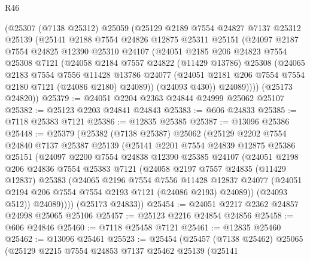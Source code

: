 \begin{lexlean}{R46}
\begin{coremodule}
    (@25307
      (@7138 @25312)
      @25059
      (@25129
        @2189
        @7554
        @24827
        @7137
        @25312
        @25139
        (@25141
          @2188
          @7554
          @24826
          @12875
          @25311
          @25151
          (@24097
            @2187
            @7554
            @24825
            @12390
            @25310
            @24107
            (@24051
              @2185
              @206
              @24823
              @7554
              @25308
              @7121
              (@24058
                @2184
                @7557
                @24822
                (@11429 @13786)
                @25308
                (@24065
                  @2183
                  @7554
                  @7556
                  @11428
                  @13786
                  @24077
                  (@24051 @2181 @206 @7554 @7554 @2180 @7121 (@24086 @2180) @24089))
                (@24093 @430))
              @24089))))
      (@25173 @24820))
@25379 := @24051 @2204 @2363 @24844 @24999 @25062 @25107
@25382 := @25123 @2203 @24841 @24843
@25383 := @606 @24833
@25385 := @7118 @25383 @7121
@25386 := @12835 @25385
@25387 := @13096 @25386
@25448 := @25379
    (@25382
      (@7138 @25387)
      @25062
      (@25129
        @2202
        @7554
        @24840
        @7137
        @25387
        @25139
        (@25141
          @2201
          @7554
          @24839
          @12875
          @25386
          @25151
          (@24097
            @2200
            @7554
            @24838
            @12390
            @25385
            @24107
            (@24051
              @2198
              @206
              @24836
              @7554
              @25383
              @7121
              (@24058
                @2197
                @7557
                @24835
                (@11429 @12837)
                @25383
                (@24065
                  @2196
                  @7554
                  @7556
                  @11428
                  @12837
                  @24077
                  (@24051 @2194 @206 @7554 @7554 @2193 @7121 (@24086 @2193) @24089))
                (@24093 @512))
              @24089))))
      (@25173 @24833))
@25454 := @24051 @2217 @2362 @24857 @24998 @25065 @25106
@25457 := @25123 @2216 @24854 @24856
@25458 := @606 @24846
@25460 := @7118 @25458 @7121
@25461 := @12835 @25460
@25462 := @13096 @25461
@25523 := @25454
    (@25457
      (@7138 @25462)
      @25065
      (@25129
        @2215
        @7554
        @24853
        @7137
        @25462
        @25139
        (@25141

\end{coremodule}
\end{lexlean}
